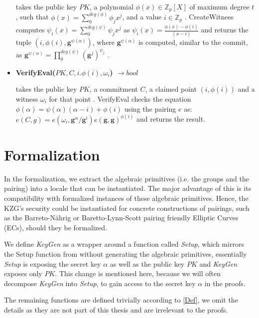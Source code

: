 \begin{itemize}
    takes the public key $PK$, a polynomial $\phi(x) \in \mathbb{Z}_p[X]$ of maximum degree $t$, such that $\phi(x)=\sum_{0}^{deg(\phi)}\phi_jx^j$, and a value $i\in\mathbb{Z}_p$ \parencite{KZG}. CreateWitness computes $\psi_i(x)=\sum_{0}^{deg(\psi)}\psi_jx^j$ as $\psi_i(x)=\frac{\phi(x)-\phi(i)}{(x-i)}$ and returns the tuple $(i,\phi(i),\mathbf{g}^{\psi(\alpha)})$, where $\mathbf{g}^{\psi(\alpha)}$ is computed, similar to the commit, as $\mathbf{g}^{\psi(\alpha)} = \prod_{0}^{deg(\psi)}(\mathbf{g}^j)^{\psi_j}$ \parencite{KZG}.
    \item \textbf{VerifyEval($PK,C,i.\phi(i),\omega_i$) $\rightarrow bool$}

    takes the public key $PK$, a commitment $C$, a claimed point $(i,\phi(i))$ and a witness $\omega_i$ for that point \parencite{KZG}. VerifyEval checks the equation $\phi(\alpha)=\psi(\alpha)(\alpha-i)+\phi(i)$ using the pairing $e$ as: $e(C,g) = e(\omega_i,\mathbf{g}^\alpha/\mathbf{g}^i)e(\mathbf{g},\mathbf{g})^{\phi(i)}$ and returns the result.
\end{itemize}





\section{Formalization}

In the formalization, we extract the algebraic primitives (i.e. the groups and the pairing) into a locale that can be instantiated. The major advantage of this is its compatibility with formalized instances of these algebraic primitives. Hence, the KZG's security could be instantiated for concrete constructions of pairings, such as the Barreto-Nährig\parencite{BN-EC} or Baretto-Lynn-Scott\parencite{BLS-EC} pairing friendly Elliptic Curves (ECs), should they be formalized.

We define \textit{KeyGen} as a wrapper around a function called \textit{Setup}, which mirrors the Setup function from \parencite{KZG} without generating the algebraic primitives, essentially \textit{Setup} is exposing the secret key $\alpha$ as well as the public key $PK$ and \textit{KeyGen} exposes only $PK$. This change is mentioned here, because we will often decompose \textit{KeyGen} into \textit{Setup}, to gain access to the secret key $\alpha$ in the proofs.

The remaining functions are defined trivially according to \ref{Def}, we omit the details as they are not part of this thesis and are irrelevant to the proofs.